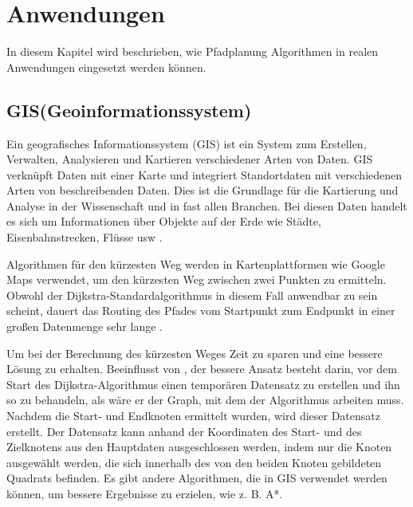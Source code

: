 \chapter{Anwendungen}
\label{Anwendungen}

In diesem Kapitel wird beschrieben, wie Pfadplanung Algorithmen in realen Anwendungen eingesetzt werden können.
\section{GIS(Geoinformationssystem)}
\label{GIS(Geoinformationssystem)}

Ein geografisches Informationssystem (GIS) ist ein System zum Erstellen, Verwalten, Analysieren und Kartieren verschiedener Arten von Daten. GIS verknüpft Daten mit einer Karte und integriert Standortdaten mit verschiedenen Arten von beschreibenden Daten. Dies ist die Grundlage für die Kartierung und Analyse in der Wissenschaft und in fast allen Branchen.
Bei diesen Daten handelt es sich um Informationen über Objekte auf der Erde wie Städte, Eisenbahnstrecken, Flüsse usw \cite{Vaibhavi2014}. 

Algorithmen für den kürzesten Weg werden in Kartenplattformen wie Google Maps verwendet, um den kürzesten Weg zwischen zwei Punkten zu ermitteln.
Obwohl der Dijkstra-Standardalgorithmus in diesem Fall anwendbar zu sein scheint, dauert das Routing des Pfades vom Startpunkt zum Endpunkt in einer großen Datenmenge sehr lange \cite{HamidAli2020}.

 Um bei der Berechnung des kürzesten Weges Zeit zu sparen und eine bessere Lösung zu erhalten. Beeinflusst von \cite{HamidAli2020}, der bessere Ansatz besteht darin, vor dem Start des Dijkstra-Algorithmus einen temporären Datensatz zu erstellen und ihn so zu behandeln, als wäre er der Graph, mit dem der Algorithmus arbeiten muss. 
 Nachdem die Start- und Endknoten ermittelt wurden, wird dieser Datensatz erstellt. Der Datensatz kann anhand der Koordinaten des Start- und des Zielknotens aus den Hauptdaten ausgeschlossen werden, indem nur die Knoten ausgewählt werden, die sich innerhalb des von den beiden Knoten gebildeten Quadrats befinden.
 Es gibt andere Algorithmen, die in GIS verwendet werden können, um bessere Ergebnisse zu erzielen, wie z. B. A*.


